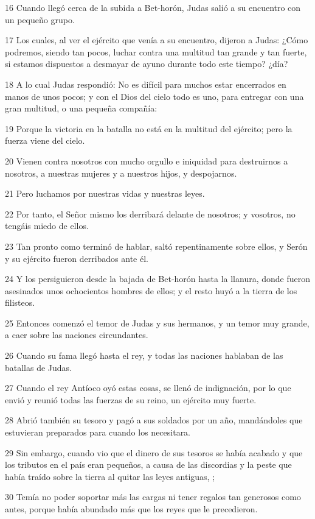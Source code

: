 \par 16 Cuando llegó cerca de la subida a Bet-horón, Judas salió a su encuentro con un pequeño grupo.
\par 17 Los cuales, al ver el ejército que venía a su encuentro, dijeron a Judas: ¿Cómo podremos, siendo tan pocos, luchar contra una multitud tan grande y tan fuerte, si estamos dispuestos a desmayar de ayuno durante todo este tiempo? ¿día?
\par 18 A lo cual Judas respondió: No es difícil para muchos estar encerrados en manos de unos pocos; y con el Dios del cielo todo es uno, para entregar con una gran multitud, o una pequeña compañía:
\par 19 Porque la victoria en la batalla no está en la multitud del ejército; pero la fuerza viene del cielo.
\par 20 Vienen contra nosotros con mucho orgullo e iniquidad para destruirnos a nosotros, a nuestras mujeres y a nuestros hijos, y despojarnos.
\par 21 Pero luchamos por nuestras vidas y nuestras leyes.
\par 22 Por tanto, el Señor mismo los derribará delante de nosotros; y vosotros, no tengáis miedo de ellos.
\par 23 Tan pronto como terminó de hablar, saltó repentinamente sobre ellos, y Serón y su ejército fueron derribados ante él.
\par 24 Y los persiguieron desde la bajada de Bet-horón hasta la llanura, donde fueron asesinados unos ochocientos hombres de ellos; y el resto huyó a la tierra de los filisteos.
\par 25 Entonces comenzó el temor de Judas y sus hermanos, y un temor muy grande, a caer sobre las naciones circundantes.
\par 26 Cuando su fama llegó hasta el rey, y todas las naciones hablaban de las batallas de Judas.
\par 27 Cuando el rey Antíoco oyó estas cosas, se llenó de indignación, por lo que envió y reunió todas las fuerzas de su reino, un ejército muy fuerte.
\par 28 Abrió también su tesoro y pagó a sus soldados por un año, mandándoles que estuvieran preparados para cuando los necesitara.
\par 29 Sin embargo, cuando vio que el dinero de sus tesoros se había acabado y que los tributos en el país eran pequeños, a causa de las discordias y la peste que había traído sobre la tierra al quitar las leyes antiguas, ;
\par 30 Temía no poder soportar más las cargas ni tener regalos tan generosos como antes, porque había abundado más que los reyes que le precedieron.
